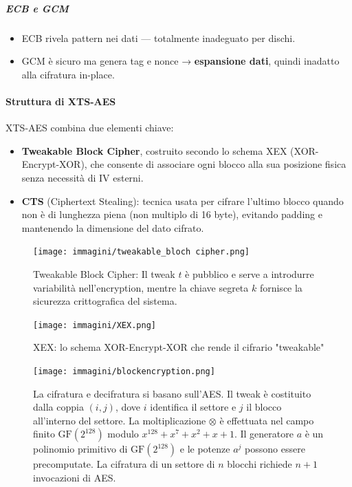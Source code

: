 \documentclass{report}
\begin{document}
\subparagraph{ECB e GCM}
\begin{itemize}
    \item ECB rivela pattern nei dati — totalmente inadeguato per dischi.
    \item GCM è sicuro ma genera tag e nonce → \textbf{espansione dati}, quindi inadatto alla cifratura in-place.
\end{itemize}

\paragraph{Struttura di XTS-AES}

XTS-AES combina due elementi chiave:

\begin{itemize}
    \item \textbf{Tweakable Block Cipher}, costruito secondo lo schema XEX (XOR-Encrypt-XOR), che consente di associare ogni blocco alla sua posizione fisica senza necessità di IV esterni.
    \item \textbf{CTS} (Ciphertext Stealing): tecnica usata per cifrare l’ultimo blocco quando non è di lunghezza piena (non multiplo di 16 byte), evitando padding e mantenendo la dimensione del dato cifrato.
\end{itemize}

\begin{figure}[h]
\centering
\texttt{[image: immagini/tweakable\_bloch cipher.png]}
\caption{Tweakable Block Cipher: Il tweak $t$ è pubblico e serve a introdurre variabilità nell'encryption, mentre la chiave segreta $k$ fornisce la sicurezza crittografica del sistema.}

\end{figure}

\begin{figure}[h]
\centering
\texttt{[image: immagini/XEX.png]}
\caption{XEX: lo schema XOR-Encrypt-XOR che rende il cifrario "tweakable"}
\end{figure}

\begin{figure}[h]
\centering
\texttt{[image: immagini/blockencryption.png]}
\caption{La cifratura e decifratura si basano sull'AES. Il tweak è costituito dalla coppia $(i, j)$, dove $i$ identifica il settore e $j$ il blocco all'interno del settore. La moltiplicazione $\otimes$ è effettuata nel campo finito $\mathrm{GF}(2^{128})$ modulo $x^{128} + x^7 + x^2 + x + 1$. Il generatore $a$ è un polinomio primitivo di $\mathrm{GF}(2^{128})$ e le potenze $a^j$ possono essere precomputate. La cifratura di un settore di $n$ blocchi richiede $n+1$ invocazioni di AES.}
\end{figure}
\end{document}
